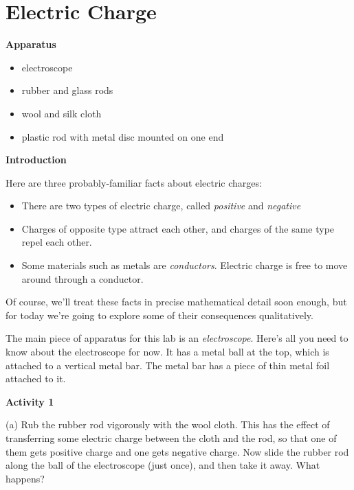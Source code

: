 \section{Electric Charge}
\begin{comment}
This lab was written by Ted Bunn for spring of 2016.  It was edited slightly by Matt Trawick for this manual in April 2016.

\end{comment}

\makelabheader %

\bigskip
\textbf{Apparatus}
\begin{itemize}
\item electroscope
\item rubber and glass rods
\item wool and silk cloth
\item plastic rod with metal disc mounted on one end
\end{itemize}

\bigskip
\textbf{Introduction}

Here are three probably-familiar facts about electric charges:

\begin{itemize}
\item There are two types of electric charge, called \textit{positive}
and \textit{negative}
\item Charges of opposite type attract each other, and charges of the same type
repel each other.
\item Some materials such as metals are \textit{conductors}. Electric charge 
is free to move around through a conductor. 
\end{itemize}

Of course, we'll treat these facts in precise mathematical detail soon
enough, but for today we're going to explore some of their consequences 
qualitatively.

The main piece of apparatus for this lab is an \textit{electroscope}. 
Here's all you need to know about the electroscope for now. It has
a metal ball at the top, which is attached to a vertical metal bar.
The metal bar has a piece of thin metal foil attached to it. 

\textbf{Activity 1}

(a) Rub the rubber rod vigorously with the wool cloth.
This has the effect of transferring some electric charge between the
cloth and the rod, so that one of them gets positive charge and one gets
negative charge.  Now slide the rubber rod along the ball of the electroscope (just once), and then take it away.
What happens?

